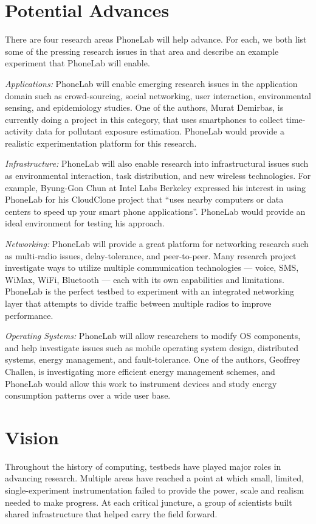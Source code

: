 \section{Potential Advances} There are four research areas
PhoneLab will help advance. For each, we both list some of the pressing
research issues in that area and describe an example experiment that
PhoneLab will enable.

\emph{Applications:} PhoneLab will enable emerging research issues in the
application domain such as crowd-sourcing, social networking, user interaction,
environmental sensing, and epidemiology studies. One of the authors, Murat
Demirbas, is currently doing a project in this category, that uses smartphones
to collect time-activity data for pollutant exposure estimation. PhoneLab
would provide a realistic experimentation platform for this research.

\emph{Infrastructure:} PhoneLab will also enable research into infrastructural
issues such as environmental interaction, task distribution, and new wireless
technologies. For example, Byung-Gon Chun at Intel Labs Berkeley expressed
his interest in using PhoneLab for his CloudClone project that
``uses nearby computers or data centers to speed up your smart phone
applications''. PhoneLab would provide an ideal environment for testing
his approach.

\emph{Networking:} PhoneLab will provide a great platform for networking
research such as multi-radio issues, delay-tolerance, and peer-to-peer.
Many research project investigate ways to utilize multiple communication
technologies --- voice, SMS, WiMax, WiFi, Bluetooth --- each with its own
capabilities and limitations. PhoneLab is the perfect testbed to experiment
with an integrated networking layer that attempts to divide traffic between
multiple radios to improve performance.

\emph{Operating Systems:} PhoneLab will allow researchers to modify OS
components, and help investigate issues such as mobile operating system
design, distributed systems, energy management, and fault-tolerance.
One of the authors, Geoffrey Challen, is investigating more efficient energy
management schemes, and PhoneLab would allow this work to instrument
devices and study energy consumption patterns over a wide user base.

\section{Vision}
Throughout the history of computing, testbeds have played major roles in
advancing research. Multiple areas have reached a point at which small,
limited, single-experiment instrumentation failed to provide the power, scale
and realism needed to make progress. At each critical juncture, a group of
scientists built shared infrastructure that helped carry the field forward.


